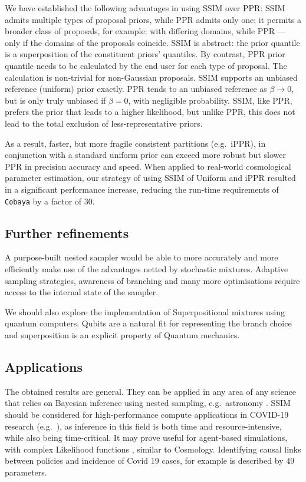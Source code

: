\documentclass[usenatbib]{mnras}
\begin{document}
We have established the following advantages in using SSIM over PPR:
SSIM admits multiple types of proposal priors, while PPR admits only
one; it permits a broader class of proposals, for example: with
differing domains, while PPR --- only if the domains of the proposals
coincide.  SSIM is abstract: the prior quantile is a superposition of
the constituent priors' quantiles. By contrast, PPR prior quantile
needs to be calculated by the end user for each type of proposal. The
calculation is non-trivial for non-Gaussian proposals. SSIM supports
an unbiased reference (uniform) prior exactly. PPR tends to an
unbiased reference as \(\beta\rightarrow 0 \), but is only truly
unbiased if $\beta=0$, with negligible probability. SSIM, like PPR,
prefers the prior that leads to a higher likelihood, but unlike PPR,
this does not lead to the total exclusion of less-representative
priors.


As a result, faster, but more fragile consistent partitions
(e.g.~iPPR), in conjunction with a standard uniform prior can exceed
more robust but slower PPR in precision accuracy and speed.  When
applied to real-world cosmological parameter estimation, our strategy
of using SSIM of Uniform and iPPR resulted in a significant
performance increase, reducing the run-time requirements of
\texttt{Cobaya} by a factor of 30.

\subsection{Further refinements}\label{sec:org8314ddf}

A purpose-built nested sampler would be able to more accurately and
more efficiently make use of the advantages netted by stochastic
mixtures. Adaptive sampling strategies, awareness of branching and
many more optimisations require access to the internal state of the
sampler.

We should also explore the implementation of Superpositional mixtures
using quantum computers. Qubits are a natural fit for representing the
branch choice and superposition is an explicit property of Quantum
mechanics.

\subsection{Applications}\label{sec:applications}
The obtained results are general. They can be applied in any area of
any science that relies on Bayesian inference using nested sampling,
e.g.~astronomy \citep{Casado_2016}. SSIM should be considered for
high-performance compute applications in COVID-19 research
(e.g.~\cite{Covid1,Covid2}), as inference in this field is both time
and resource-intensive, while also being time-critical. It may prove
useful for agent-based simulations, with complex Likelihood functions
\citep{Covid2}, similar to Cosmology. Identifying causal links between
policies and incidence of Covid 19 cases, for example is described by
49 parameters.
\end{document}

